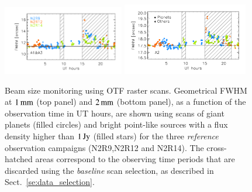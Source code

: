 \begin{figure}[ht!]
  \begin{center}
    \includegraphics[clip=true, trim={0.9cm, 0.5cm, 0.5cm, 0.5cm}, width=0.4725\textwidth]{Figures/Beam_monitoring_with_otfs_vs_ut_1mm.pdf}
    \includegraphics[clip=true, trim={0.5cm, 0.5cm, 0.5cm, 0.5cm}, width=0.4875\textwidth]{Figures/Beam_monitoring_with_otfs_vs_ut_a2.pdf}
    \caption[Beam size monitoring using OTF scans]{Beam size
      monitoring using OTF raster scans. Geometrical FWHM at $1\,\rm{mm}$ (top panel)
      and $2\,\rm{mm}$ (bottom panel), as a function of the
      observation time in UT hours, are shown using scans of giant
      planets (filled circles) and bright point-like sources with a
      flux density higher than $1\,\rm{Jy}$ (filled stars) for the three \emph{reference}
      observation campaigns (N2R9,N2R12 and N2R14). The cross-hatched areas
      correspond to the observing time periods that are discarded using
      the \emph{baseline} scan selection, as described in Sect.~\ref{se:data_selection}.} 
\label{fig:beam_monitoring_otf}
  \end{center}
\end{figure}


